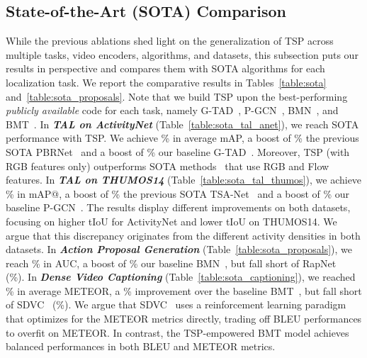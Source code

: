 \documentclass[10pt,twocolumn,letterpaper]{article}
\begin{document}
\subsection{State-of-the-Art (SOTA) Comparison}
While the previous ablations shed light on the generalization of TSP across multiple tasks, video encoders, algorithms, and datasets, this subsection puts our results in perspective and compares them with SOTA algorithms for each localization task. We report the comparative results in Tables~\ref{table:sota} and~\ref{table:sota_proposals}. Note that we build TSP upon the best-performing \textit{publicly available} code for each task, namely G-TAD~\cite{xu2020gtad}, P-GCN~\cite{Zeng_2019_ICCV}, BMN~\cite{Lin_2019_ICCV}, and BMT~\cite{bmt}. 
In \textbf{\textit{TAL on ActivityNet}} (Table~\ref{table:sota_tal_anet}), we reach SOTA performance with TSP. We achieve \% in average mAP, a boost of \% \wrt the previous SOTA PBRNet~\cite{liu2020progressive} and a boost of \% \wrt our baseline G-TAD~\cite{xu2020gtad}. Moreover, TSP (with RGB features only) outperforms SOTA methods~\cite{li2020deep,Lin_2019_ICCV,liu2020progressive,xu2020gtad,Zeng_2019_ICCV} that use RGB and Flow features.
In \textbf{\textit{TAL on THUMOS14}} (Table~\ref{table:sota_tal_thumos}), we achieve \% in mAP@, a boost of \% \wrt the previous SOTA TSA-Net~\cite{TSA_Net} and a boost of \% \wrt our baseline P-GCN~\cite{Zeng_2019_ICCV}. The results display different improvements on both datasets, focusing on higher tIoU for ActivityNet and lower tIoU on THUMOS14. We argue that this discrepancy originates from the different activity densities in both datasets.
In \textbf{\textit{Action Proposal Generation}} (Table~\ref{table:sota_proposals}), we reach \% in AUC, a boost of \% \wrt our baseline BMN~\cite{Lin_2019_ICCV}, but fall short of RapNet~\cite{gao2020accurate} (\%). 
In \textbf{\textit{Dense Video Captioning}} (Table~\ref{table:sota_captioning}), we reached \% in average METEOR, a \% improvement over the baseline BMT~\cite{bmt}, but fall short of SDVC~\cite{sdvc} (\%). We argue that SDVC~\cite{sdvc} uses a reinforcement learning paradigm that optimizes for the METEOR metrics directly, trading off BLEU performances to overfit on METEOR. In contrast, the TSP-empowered BMT model achieves balanced performances in both BLEU and METEOR metrics.
\end{document}

